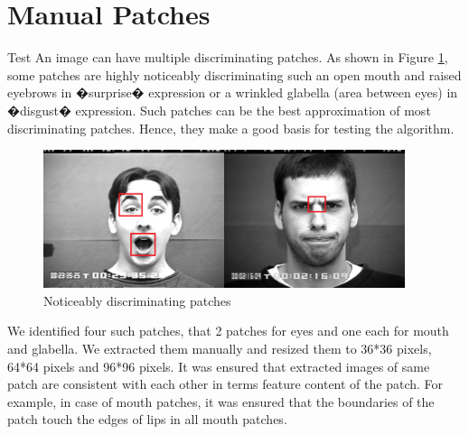 
\section{Manual Patches}
Test
An image can have multiple discriminating patches. As shown in Figure \ref{fig:manual_patch}, some patches are highly noticeably discriminating such an open mouth and raised eyebrows in �surprise� expression or a wrinkled glabella (area between eyes) in �disgust� expression. Such patches can be the best approximation of most discriminating patches. Hence, they make a good basis for testing the algorithm. 

\begin{figure}
\centering
\includegraphics[width=300pt]{manual_patch.png}
  \caption{Noticeably discriminating patches}
  \label{fig:manual_patch}
\end{figure}

We identified four such patches, that 2 patches for eyes and one each for mouth and glabella. We extracted them manually and resized them to 36*36 pixels, 64*64 pixels and 96*96 pixels. It was ensured that extracted images of same patch are consistent with each other in terms feature content of the patch. For example, in case of mouth patches, it was ensured that the boundaries of the patch touch the edges of lips in all mouth patches.  


